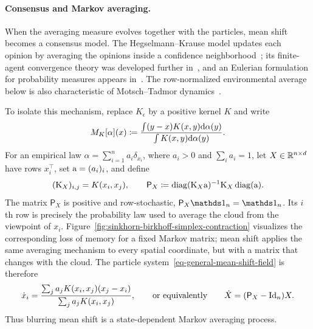 \paragraph{Consensus and Markov averaging.}

When the averaging measure evolves together with the particles, mean shift becomes a consensus model. The Hegselmann--Krause model updates each opinion by averaging the opinions inside a confidence neighborhood~\cite{HegselmannKrause2002OpinionDynamics}; its finite-agent convergence theory was developed further in~\cite{BlondelHendrickxTsitsiklis2009Krause}, and an Eulerian formulation for probability measures appears in~\cite{CanutoFagnaniTilli2012EulerianKrause}. The row-normalized environmental average below is also characteristic of Motsch--Tadmor dynamics~\cite{MotschTadmor2014Heterophilious}.

To isolate this mechanism, replace $K_\epsilon$ by a positive kernel $K$ and write
\begin{equation}\label{eq-general-mean-shift-field}
	M_K[\alpha](x)
	\coloneqq
	\frac{\int (y-x)K(x,y)\mathrm{d}\alpha(y)}
	     {\int K(x,y)\mathrm{d}\alpha(y)}.
\end{equation}
For an empirical law $\alpha=\sum_{i=1}^n a_i\delta_{x_i}$, where $a_i>0$ and $\sum_i a_i=1$, let $X\in\mathbb{R}^{n\times d}$ have rows $x_i^\top$, set $\mathrm{a}=(a_i)_i$, and define
\begin{equation}\label{eq-mean-shift-markov-matrix}
	(\mathrm{K}_X)_{i,j}=K(x_i,x_j),
	\qquad
	\mathsf P_X
	\coloneqq
	\operatorname{diag}(\mathrm{K}_X\mathrm{a})^{-1}\mathrm{K}_X\operatorname{diag}(\mathrm{a}).
\end{equation}
The matrix $\mathsf P_X$ is positive and row-stochastic, $\mathsf P_X\ones_n=\ones_n$. Its $i$th row is precisely the probability law used to average the cloud from the viewpoint of $x_i$. Figure~\ref{fig:sinkhorn-birkhoff-simplex-contraction} visualizes the corresponding loss of memory for a fixed Markov matrix; mean shift applies the same averaging mechanism to every spatial coordinate, but with a matrix that changes with the cloud. The particle system~\eqref{eq-general-mean-shift-field} is therefore
\begin{equation}\label{eq-mean-shift-particle-system}
	\dot x_i
	=
	\frac{\sum_j a_jK(x_i,x_j)(x_j-x_i)}
	     {\sum_j a_jK(x_i,x_j)},
	\qquad\text{or equivalently}\qquad
	\dot X=(\mathsf P_X-\mathrm{Id}_n)X.
\end{equation}
Thus blurring mean shift is a state-dependent Markov averaging process.

